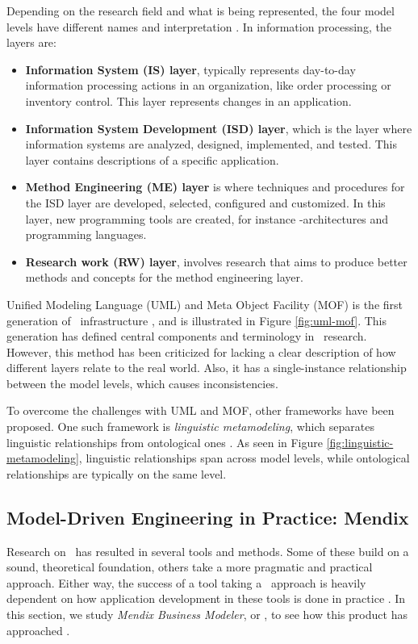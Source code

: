 Depending on the research field and what is being represented, the four model levels have different names and interpretation \cite{Leppanen2006-ay}. In information processing, the layers are:
\begin{itemize}
    \item \textbf{Information System (IS) layer}, typically represents day-to-day information processing actions in an organization, like order processing or inventory control. This layer represents changes in an application.
    \item \textbf{Information System Development (ISD) layer}, which is the layer where information systems are analyzed, designed, implemented, and tested. This layer contains descriptions of a specific application.
    \item \textbf{Method Engineering (ME) layer} is where techniques and procedures for the ISD layer are developed, selected, configured and customized. In this layer, new programming tools are created, for instance \mdd-architectures and programming languages.
    \item \textbf{Research work (RW) layer}, involves research that aims to produce better methods and concepts for the method engineering layer.
\end{itemize}

Unified Modeling Language (UML) and Meta Object Facility (MOF) is the first generation of \mdd~infrastructure \cite{Atkinson2003-wr}, and is illustrated in Figure \ref{fig:uml-mof}. This generation has defined central components and terminology in \mde~research. However, this method has been criticized for lacking a clear description of how different layers relate to the real world. Also, it has a single-instance relationship between the model levels, which causes inconsistencies.

To overcome the challenges with UML and MOF, other frameworks have been proposed. One such framework is \textit{linguistic metamodeling}, which separates linguistic relationships from ontological ones \cite{Atkinson2003-wr}. As seen in Figure \ref{fig:linguistic-metamodeling}, linguistic relationships span across model levels, while ontological relationships are typically on the same level. 

\subsection{Model-Driven Engineering in Practice: Mendix}
\label{sub:Model-Driven Engineering in Practice: Mendix}
Research on \mde~has resulted in several tools and methods. Some of these build on a sound, theoretical foundation, others take a more pragmatic and practical approach. Either way, the success of a tool taking a \mdd~approach is heavily dependent on how application development in these tools is done in practice \cite{Henkel2010-sy}. In this section, we study \textit{Mendix Business Modeler}, or \mendix, to see how this product has approached \mde. 

